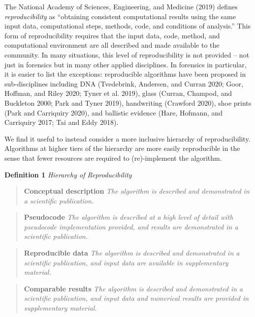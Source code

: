 The National Academy of Sciences, Engineering, and Medicine (2019) defines \emph{reproducibility} as ``obtaining consistent computational results using the same input data, computational steps, methods, code, and conditions of analysis.'' This form of reproducibility requires that the input data, code, method, and computational environment are all described and made available to the community.
In many situations, this level of reproducibility is not provided -- not just in forensics but in many other applied disciplines.
In forensics in particular, it is easier to list the exceptions: reproducible algorithms have been proposed in sub-disciplines including DNA (Tvedebrink, Andersen, and Curran 2020; Goor, Hoffman, and Riley 2020; Tyner et al. 2019), glass (Curran, Champod, and Buckleton 2000; Park and Tyner 2019), handwriting (Crawford 2020), shoe prints (Park and Carriquiry 2020), and ballistic evidence (Hare, Hofmann, and Carriquiry 2017; Tai and Eddy 2018).

We find it useful to instead consider a more inclusive hierarchy of reproducibility.
Algorithms at higher tiers of the hierarchy are more easily reproducible in the sense that fewer resources are required to (re)-implement the algorithm.

\textbf{Definition 1} \emph{Hierarchy of Reproducibility}

\begin{quote}
\textbf{Conceptual description} \emph{The algorithm is described and demonstrated in a scientific publication.}
\end{quote}

\begin{quote}
\textbf{Pseudocode} \emph{The algorithm is described at a high level of detail with pseudocode implementation provided, and results are demonstrated in a scientific publication.}
\end{quote}

\begin{quote}
\textbf{Reproducible data} \emph{The algorithm is described and demonstrated in a scientific publication, and input data are available in supplementary material.}
\end{quote}

\begin{quote}
\textbf{Comparable results} \emph{The algorithm is described and demonstrated in a scientific publication, and input data and numerical results are provided in supplementary material.}
\end{quote}

